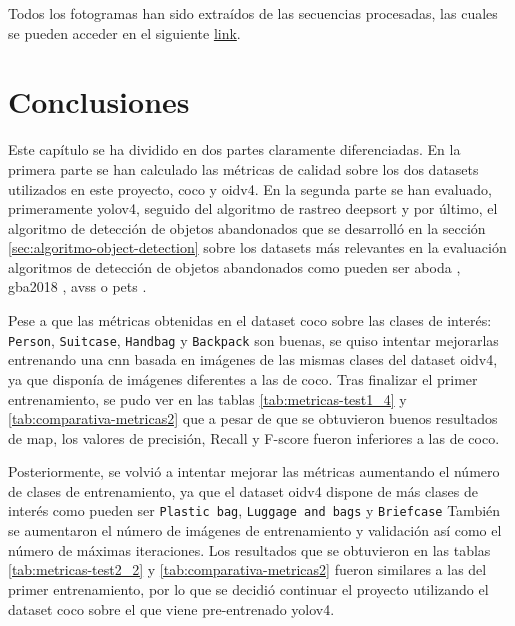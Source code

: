 Todos los fotogramas han sido extraídos de las secuencias procesadas, las cuales se pueden acceder en el siguiente \href{https://drive.google.com/drive/folders/1AA4KZCpsEW6MTdHJdu8mLKuGE1BCX9de?usp=sharing}{link}.

\newpage %

\section{Conclusiones}
\label{sec:conclu-resultados}

Este capítulo se ha dividido en dos partes claramente diferenciadas. En la primera parte se han calculado las métricas de calidad sobre los dos datasets utilizados en este proyecto, \gls{coco} y \gls{oidv4}. En la segunda parte se han evaluado, primeramente \gls{yolov4}, seguido del algoritmo de rastreo \gls{deepsort} y por último, el algoritmo de detección de objetos abandonados que se desarrolló en la sección \ref{sec:algoritmo-object-detection} sobre los datasets más relevantes en la evaluación algoritmos de detección de objetos abandonados como pueden ser \gls{aboda} \cite{aboda-dataset}, \gls{gba2018} \cite{gba-dataset}, \gls{avss} \cite{AVSSAB2007-dataset} o \gls{pets} \cite{pets2007-dataset}.

Pese a que las métricas obtenidas en el dataset \gls{coco} sobre las clases de interés: \texttt{Person}, \texttt{Suitcase}, \texttt{Handbag} y \texttt{Backpack} son buenas, se quiso intentar mejorarlas entrenando una \gls{cnn} basada en imágenes de las mismas clases del dataset \gls{oidv4}, ya que disponía de imágenes diferentes a las de \gls{coco}. Tras finalizar el primer entrenamiento, se pudo ver en las tablas \ref{tab:metricas-test1_4} y \ref{tab:comparativa-metricas2} que a pesar de que se obtuvieron buenos resultados de \gls{map}, los valores de precisión, Recall y F-score fueron inferiores a las de \gls{coco}.

Posteriormente, se volvió a intentar mejorar las métricas aumentando el número de clases de entrenamiento, ya que el dataset \gls{oidv4} dispone de más clases de interés como pueden ser \texttt{Plastic bag}, \texttt{Luggage and bags} y \texttt{Briefcase} También se aumentaron el número de imágenes de entrenamiento y validación así como el número de máximas iteraciones. Los resultados que se obtuvieron en las tablas \ref{tab:metricas-test2_2}  y \ref{tab:comparativa-metricas2} fueron similares a las del primer entrenamiento, por lo que se decidió continuar el proyecto utilizando el dataset \gls{coco} sobre el que viene pre-entrenado \gls{yolov4}.

